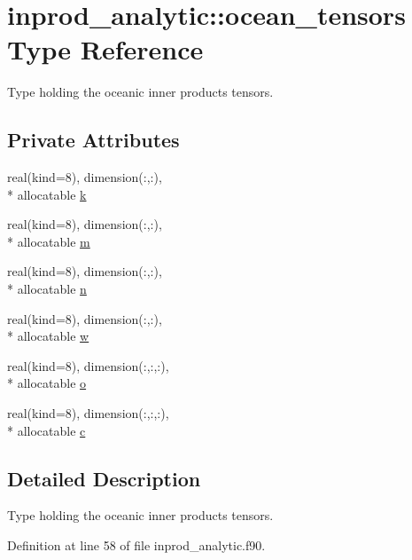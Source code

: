 \hypertarget{structinprod__analytic_1_1ocean__tensors}{\section{inprod\-\_\-analytic\-:\-:ocean\-\_\-tensors Type Reference}
\label{structinprod__analytic_1_1ocean__tensors}
}


Type holding the oceanic inner products tensors.  


\subsection*{Private Attributes}
\begin{DoxyCompactItemize}
\item 
real(kind=8), dimension(\-:,\-:), \\*
allocatable \hyperlink{structinprod__analytic_1_1ocean__tensors_a1ab0d8f229b274e954a53cc1ce40cac1}{k}
\item 
real(kind=8), dimension(\-:,\-:), \\*
allocatable \hyperlink{structinprod__analytic_1_1ocean__tensors_a6f8f8b2b4ef239db0a9f751d7e8452e8}{m}
\item 
real(kind=8), dimension(\-:,\-:), \\*
allocatable \hyperlink{structinprod__analytic_1_1ocean__tensors_a5087e225a596aee2d668f6282dd6a019}{n}
\item 
real(kind=8), dimension(\-:,\-:), \\*
allocatable \hyperlink{structinprod__analytic_1_1ocean__tensors_ae4875d9d3ea854b3b7b57e0c07a07ede}{w}
\item 
real(kind=8), dimension(\-:,\-:,\-:), \\*
allocatable \hyperlink{structinprod__analytic_1_1ocean__tensors_abab4899297820e7a92cc8d363a91ed13}{o}
\item 
real(kind=8), dimension(\-:,\-:,\-:), \\*
allocatable \hyperlink{structinprod__analytic_1_1ocean__tensors_a146670849488f50eff7b1937077a67ff}{c}
\end{DoxyCompactItemize}


\subsection{Detailed Description}
Type holding the oceanic inner products tensors. 

Definition at line 58 of file inprod\-\_\-analytic.\-f90.



